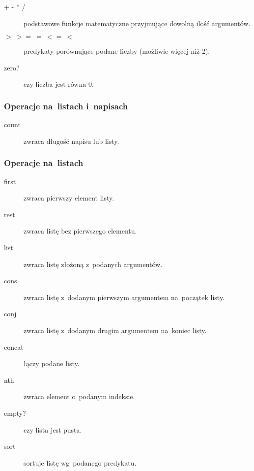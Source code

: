 \documentclass[a4paper,11pt]{article}
\newcommand{\clj}[1]{
\inputminted[fontsize=\footnotesize,frame=single,samepage=true]{clojure}{code/#1.clj}
}
\begin{document}
\begin{description}
\item[+ - * /] podstawowe funkcje matematyczne przyjmujące dowolną ilość
  argumentów.

\item[$> \ >= \ = \ <= \ <$] predykaty porównujące podane liczby (możliwie
  więcej niż 2).

\item[zero?] czy liczba jest równa 0.
\end{description}

\subsubsection{Operacje na~listach i~napisach}

\begin{description}
\item[count] zwraca długość napisu lub listy.
\end{description}

\subsubsection{Operacje na~listach}

\begin{description}
\item[first] zwraca pierwszy element listy.

\item[rest] zwraca listę bez pierwszego elementu.

\item[list] zwraca listę złożoną z~podanych argumentów.

\item[cons] zwraca listę z~dodanym pierwszym argumentem na~początek listy.

\item[conj] zwraca listę z~dodanym drugim argumentem na~koniec listy.

\item[concat] łączy podane listy.

\item[nth] zwraca element o~podanym indeksie.

\item[empty?] czy lista jest pusta.

\item[sort] sortuje listę wg~podanego predykatu.
  \clj{sort}

\end{description}
\end{document}
